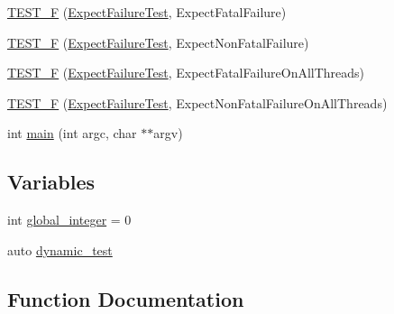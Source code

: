 \begin{DoxyCompactItemize}
\item 
\mbox{\hyperlink{googletest-master_2googletest_2test_2googletest-output-test___8cc_ae7459e6b9516821fd0e77eb3aa9b7413}{T\+E\+S\+T\+\_\+F}} (\mbox{\hyperlink{class_expect_failure_test}{Expect\+Failure\+Test}}, Expect\+Fatal\+Failure)
\item 
\mbox{\hyperlink{googletest-master_2googletest_2test_2googletest-output-test___8cc_abec150ac715359c89fde1102cfc300d2}{T\+E\+S\+T\+\_\+F}} (\mbox{\hyperlink{class_expect_failure_test}{Expect\+Failure\+Test}}, Expect\+Non\+Fatal\+Failure)
\item 
\mbox{\hyperlink{googletest-master_2googletest_2test_2googletest-output-test___8cc_a1f29562e9248524dda90aa6d641d77ea}{T\+E\+S\+T\+\_\+F}} (\mbox{\hyperlink{class_expect_failure_test}{Expect\+Failure\+Test}}, Expect\+Fatal\+Failure\+On\+All\+Threads)
\item 
\mbox{\hyperlink{googletest-master_2googletest_2test_2googletest-output-test___8cc_a7714d1899711a604704737897595e7c3}{T\+E\+S\+T\+\_\+F}} (\mbox{\hyperlink{class_expect_failure_test}{Expect\+Failure\+Test}}, Expect\+Non\+Fatal\+Failure\+On\+All\+Threads)
\item 
int \mbox{\hyperlink{googletest-master_2googletest_2test_2googletest-output-test___8cc_a3c04138a5bfe5d72780bb7e82a18e627}{main}} (int argc, char $\ast$$\ast$argv)
\end{DoxyCompactItemize}
\subsection*{Variables}
\begin{DoxyCompactItemize}
\item 
int \mbox{\hyperlink{googletest-master_2googletest_2test_2googletest-output-test___8cc_a81be7f35ea2573ecc7ca08b26b56bccf}{global\+\_\+integer}} = 0
\item 
auto \mbox{\hyperlink{googletest-master_2googletest_2test_2googletest-output-test___8cc_af938c5e98ea6bb8c43a7bd0d8d3007b5}{dynamic\+\_\+test}}
\end{DoxyCompactItemize}


\subsection{Function Documentation}
\mbox{\label{googletest-master_2googletest_2test_2googletest-output-test___8cc_a36cd4d21174efaa3066237d716028d49}} 
